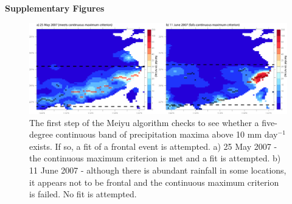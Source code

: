 \documentclass[draft,grl]{agutexSI}
\begin{document}
\begin{article}
\clearpage

\noindent\textbf{Supplementary Figures}

\begin{figure}
\noindent\includegraphics[width=36pc]{Figures/S1}
\caption{The first step of the Meiyu algorithm checks to see whether a five-degree continuous band of precipitation maxima above 10 mm day$^{-1}$ exists. If so, a fit of a frontal event is attempted. a) 25 May 2007 - the continuous maximum criterion is met and a fit is attempted. b) 11 June 2007 - although there is abundant rainfall in some locations, it appears not to be frontal and the continuous maximum criterion is failed. No fit is attempted.}
\end{figure}


\end{article}
\end{document}
